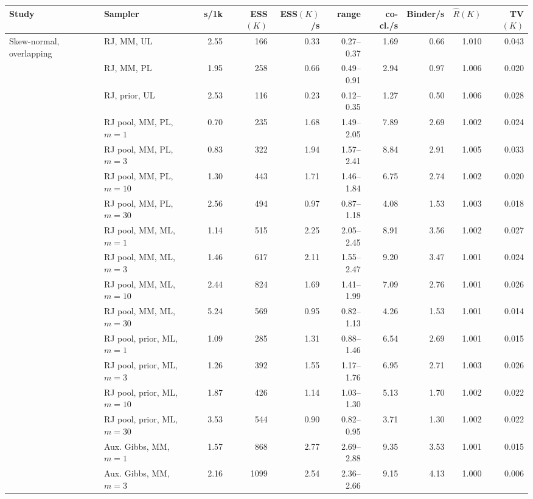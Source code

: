 \begin{tabular}{ll rrrrrrrr}
\toprule
Study & Sampler & s/1k & ESS$(K)$ & ESS$(K)$/s & range & co-cl./s & Binder/s & $\hat R(K)$ & TV$(K)$ \\
\midrule
Skew-normal, overlapping & RJ, MM, UL & 2.55 & 166 & 0.33 & 0.27--0.37 & 1.69 & 0.66 & 1.010 & 0.043 \\
 & RJ, MM, PL & 1.95 & 258 & 0.66 & 0.49--0.91 & 2.94 & 0.97 & 1.006 & 0.020 \\
 & RJ, prior, UL & 2.53 & 116 & 0.23 & 0.12--0.35 & 1.27 & 0.50 & 1.006 & 0.028 \\
 & RJ pool, MM, PL, $m{=}1$ & 0.70 & 235 & 1.68 & 1.49--2.05 & 7.89 & 2.69 & 1.002 & 0.024 \\
 & RJ pool, MM, PL, $m{=}3$ & 0.83 & 322 & 1.94 & 1.57--2.41 & 8.84 & 2.91 & 1.005 & 0.033 \\
 & RJ pool, MM, PL, $m{=}10$ & 1.30 & 443 & 1.71 & 1.46--1.84 & 6.75 & 2.74 & 1.002 & 0.020 \\
 & RJ pool, MM, PL, $m{=}30$ & 2.56 & 494 & 0.97 & 0.87--1.18 & 4.08 & 1.53 & 1.003 & 0.018 \\
 & RJ pool, MM, ML, $m{=}1$ & 1.14 & 515 & 2.25 & 2.05--2.45 & 8.91 & 3.56 & 1.002 & 0.027 \\
 & RJ pool, MM, ML, $m{=}3$ & 1.46 & 617 & 2.11 & 1.55--2.47 & 9.20 & 3.47 & 1.001 & 0.024 \\
 & RJ pool, MM, ML, $m{=}10$ & 2.44 & 824 & 1.69 & 1.41--1.99 & 7.09 & 2.76 & 1.001 & 0.026 \\
 & RJ pool, MM, ML, $m{=}30$ & 5.24 & 569 & 0.95 & 0.82--1.13 & 4.26 & 1.53 & 1.001 & 0.014 \\
 & RJ pool, prior, ML, $m{=}1$ & 1.09 & 285 & 1.31 & 0.88--1.46 & 6.54 & 2.69 & 1.001 & 0.015 \\
 & RJ pool, prior, ML, $m{=}3$ & 1.26 & 392 & 1.55 & 1.17--1.76 & 6.95 & 2.71 & 1.003 & 0.026 \\
 & RJ pool, prior, ML, $m{=}10$ & 1.87 & 426 & 1.14 & 1.03--1.30 & 5.13 & 1.70 & 1.002 & 0.022 \\
 & RJ pool, prior, ML, $m{=}30$ & 3.53 & 544 & 0.90 & 0.82--0.95 & 3.71 & 1.30 & 1.002 & 0.022 \\
 & Aux. Gibbs, MM, $m{=}1$ & 1.57 & 868 & 2.77 & 2.69--2.88 & 9.35 & 3.53 & 1.001 & 0.015 \\
 & Aux. Gibbs, MM, $m{=}3$ & 2.16 & 1099 & 2.54 & 2.36--2.66 & 9.15 & 4.13 & 1.000 & 0.006 \\

\end{tabular}
